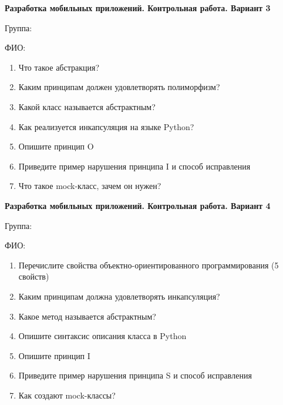 \documentclass[12pt]{article}
\begin{document}
\vspace{40pt}\begin{minipage}{\textwidth}
\textbf{Разработка мобильных приложений. Контрольная работа. Вариант 3}

Группа: \underline{\hspace{3cm}}

ФИО: \underline{\hspace{10cm}}

\begin{enumerate}
\item Что такое абстракция?
\item Каким принципам должен удовлетворять полиморфизм?
\item Какой класс называется абстрактным?
\item Как реализуется инкапсуляция на языке Python?
\item Опишите принцип O
\item Приведите пример нарушения принципа I и способ исправления
\item Что такое mock-класс, зачем он нужен?

\end{enumerate}
\end{minipage}

\vspace{40pt}\begin{minipage}{\textwidth}
\textbf{Разработка мобильных приложений. Контрольная работа. Вариант 4}

Группа: \underline{\hspace{3cm}}

ФИО: \underline{\hspace{10cm}}

\begin{enumerate}
\item Перечислите свойства объектно-ориентированного программирования (5 свойств)
\item Каким принципам должна удовлетворять инкапсуляция?
\item Какое метод называется абстрактным?
\item Опишите синтаксис описания класса в Python
\item Опишите принцип I
\item Приведите пример нарушения принципа S и способ исправления
\item Как создают mock-классы?

\end{enumerate}
\end{minipage}
\end{document}
